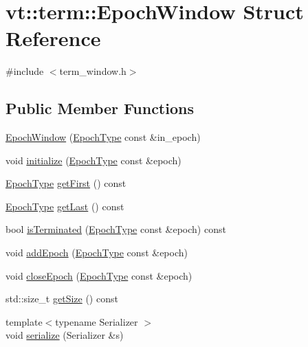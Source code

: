 \hypertarget{structvt_1_1term_1_1_epoch_window}{}\section{vt\+:\+:term\+:\+:Epoch\+Window Struct Reference}
\label{structvt_1_1term_1_1_epoch_window}


{\ttfamily \#include $<$term\+\_\+window.\+h$>$}

\subsection*{Public Member Functions}
\begin{DoxyCompactItemize}
\item 
\hyperlink{structvt_1_1term_1_1_epoch_window_a48e5c7c25ba6572ef86f82ee7c7af2ed}{Epoch\+Window} (\hyperlink{namespacevt_a985a5adf291c34a3ca263b3378388236}{Epoch\+Type} const \&in\+\_\+epoch)
\item 
void \hyperlink{structvt_1_1term_1_1_epoch_window_a2c55839ab883365d71d1de785744df9e}{initialize} (\hyperlink{namespacevt_a985a5adf291c34a3ca263b3378388236}{Epoch\+Type} const \&epoch)
\item 
\hyperlink{namespacevt_a985a5adf291c34a3ca263b3378388236}{Epoch\+Type} \hyperlink{structvt_1_1term_1_1_epoch_window_a2775ad5ee039b9c319403ec4184cdd1c}{get\+First} () const
\item 
\hyperlink{namespacevt_a985a5adf291c34a3ca263b3378388236}{Epoch\+Type} \hyperlink{structvt_1_1term_1_1_epoch_window_a3e3f2c54fef79025183e4edb61f404dd}{get\+Last} () const
\item 
bool \hyperlink{structvt_1_1term_1_1_epoch_window_a9617344ff1e04ab54dd4a414ac42c349}{is\+Terminated} (\hyperlink{namespacevt_a985a5adf291c34a3ca263b3378388236}{Epoch\+Type} const \&epoch) const
\item 
void \hyperlink{structvt_1_1term_1_1_epoch_window_a38502baeeae067a563d611e0e31e5e44}{add\+Epoch} (\hyperlink{namespacevt_a985a5adf291c34a3ca263b3378388236}{Epoch\+Type} const \&epoch)
\item 
void \hyperlink{structvt_1_1term_1_1_epoch_window_ac4f58e068b8458f8fd8520474ab8e4c7}{close\+Epoch} (\hyperlink{namespacevt_a985a5adf291c34a3ca263b3378388236}{Epoch\+Type} const \&epoch)
\item 
std\+::size\+\_\+t \hyperlink{structvt_1_1term_1_1_epoch_window_ac33e7c5184370881532550540f2aa7b3}{get\+Size} () const
\item 
{\footnotesize template$<$typename Serializer $>$ }\\void \hyperlink{structvt_1_1term_1_1_epoch_window_af8b73efb219304a24cf6c77c36d0a4f4}{serialize} (Serializer \&s)
\end{DoxyCompactItemize}
